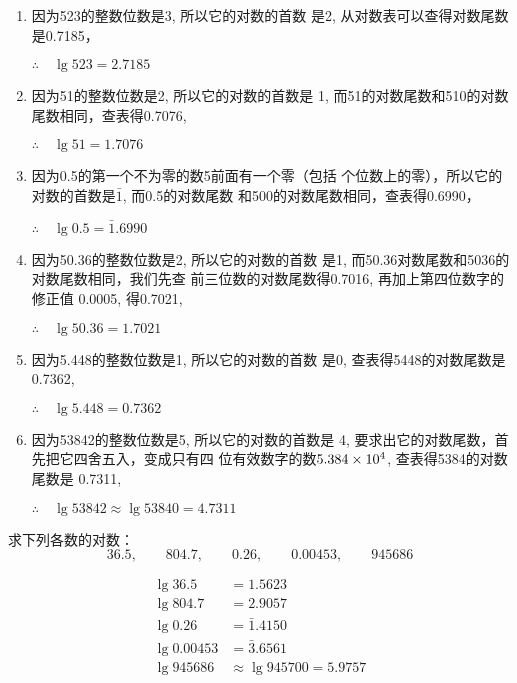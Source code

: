 \begin{solution}
\begin{enumerate}
    \item  因为523的整数位数是3, 所以它的对数的首数
    是2, 从对数表可以查得对数尾数是0.7185，

    $\therefore\quad \lg523=2.7185$
    \item  因为51的整数位数是2, 所以它的对数的首数是
    1, 而51的对数尾数和510的对数尾数相同，查表得0.7076,

    $\therefore\quad \lg51=1.7076$
    \item  因为0.5的第一个不为零的数5前面有一个零（包括
    个位数上的零），所以它的对数的首数是$\bar{1}$, 而0.5的对数尾数
    和500的对数尾数相同，查表得0.6990，

    $\therefore\quad \lg0.5=\bar{1}.6990$
    \item  因为50.36的整数位数是2, 所以它的对数的首数
    是1, 而50.36对数尾数和5036的对数尾数相同，我们先查
    前三位数的对数尾数得0.7016, 再加上第四位数字的修正值
    0.0005, 得0.7021,

    $\therefore\quad \lg50.36=1.7021$
    \item  因为5.448的整数位数是1, 所以它的对数的首数
    是0, 查表得5448的对数尾数是0.7362,

    $\therefore\quad \lg5.448=0.7362$
    \item  因为53842的整数位数是5, 所以它的对数的首数是
    4, 要求出它的对数尾数，首先把它四舍五入，变成只有四
    位有效数字的数$5.384\times10^4$, 查表得5384的对数尾数是
    0.7311,

    $\therefore\quad \lg53842\approx \lg53840=4.7311$
\end{enumerate}
\end{solution}    

\begin{example}
    求下列各数的对数：
    \[36.5,\qquad 804.7,\qquad 0.26 ,\qquad 0.00453 ,\qquad 945686\]
\end{example}

\begin{solution}
\[\begin{split}
    \lg 36.5&=1.5623\\
    \lg 804.7&=2.9057\\
    \lg 0.26&=\bar{1}.4150\\
    \lg 0.00453&= \bar{3}.6561\\
    \lg 945686  &\approx  \lg945700=5.9757
\end{split}\]
\end{solution}
    

